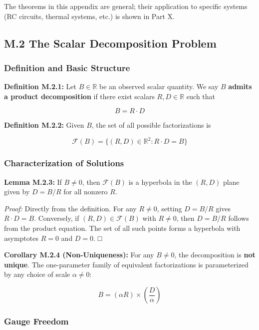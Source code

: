 \documentclass[
]{article}
\begin{document}
The theorems in this appendix are general; their application to specific
systems (RC circuits, thermal systems, etc.) is shown in Part X.

\subsection{M.2 The Scalar Decomposition
Problem}\label{m.2-the-scalar-decomposition-problem}

\subsubsection{Definition and Basic
Structure}\label{definition-and-basic-structure}

\textbf{Definition M.2.1:} Let \(B \in \mathbb{R}\) be an observed
scalar quantity. We say \(B\) \textbf{admits a product decomposition} if
there exist scalars \(R, D \in \mathbb{R}\) such that

\[B = R \cdot D\]

\textbf{Definition M.2.2:} Given \(B\), the set of all possible
factorizations is

\[\mathcal{F}(B) = \{(R, D) \in \mathbb{R}^2 : R \cdot D = B\}\]

\subsubsection{Characterization of
Solutions}\label{characterization-of-solutions}

\textbf{Lemma M.2.3:} If \(B \neq 0\), then \(\mathcal{F}(B)\) is a
hyperbola in the \((R, D)\) plane given by \(D = B/R\) for all nonzero
\(R\).

\emph{Proof:} Directly from the definition. For any \(R \neq 0\),
setting \(D = B/R\) gives \(R \cdot D = B\). Conversely, if
\((R, D) \in \mathcal{F}(B)\) with \(R \neq 0\), then \(D = B/R\)
follows from the product equation. The set of all such points forms a
hyperbola with asymptotes \(R = 0\) and \(D = 0\). □

\textbf{Corollary M.2.4 (Non-Uniqueness):} For any \(B \neq 0\), the
decomposition is \textbf{not unique}. The one-parameter family of
equivalent factorizations is parameterized by any choice of scale
\(\alpha \neq 0\):

\[B = (\alpha R) \times \left(\frac{D}{\alpha}\right)\]

\subsubsection{Gauge Freedom}\label{gauge-freedom}
\end{document}
